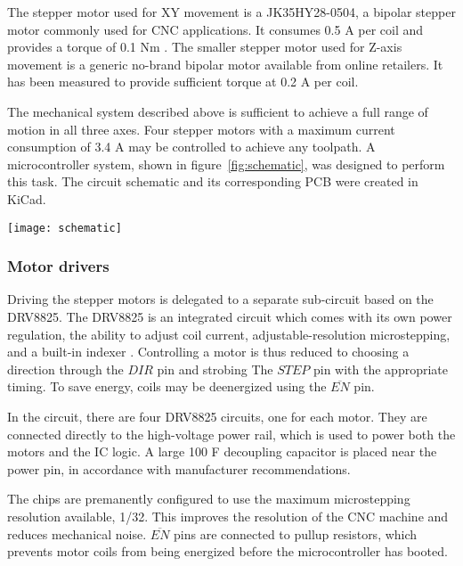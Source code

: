 The stepper motor used for XY movement is a JK35HY28-0504, a bipolar stepper
motor commonly used for CNC applications. It consumes 0.5 A per coil and
provides a torque of 0.1 Nm \cite{jk35hy28}. The smaller stepper motor used for
Z-axis movement is a generic no-brand bipolar motor available from online
retailers. It has been measured to provide sufficient torque at 0.2 A per coil.

The mechanical system described above is sufficient to achieve a full range of
motion in all three axes. Four stepper motors with a maximum current consumption
of 3.4 A may be controlled to achieve any toolpath. A microcontroller system,
shown in figure~\ref{fig:schematic}, was designed to perform this task. The
circuit schematic and its corresponding PCB were created in KiCad.

\clearpage
\begin{sidewaysfigure}[ht]
    \texttt{[image: schematic]}
    \caption{A schematic of the microcontroller system.}
    \label{fig:schematic}
\end{sidewaysfigure}

\clearpage

\subsubsection{Motor drivers}

Driving the stepper motors is delegated to a separate sub-circuit based on the
DRV8825. The DRV8825 is an integrated circuit which comes with its own power
regulation, the ability to adjust coil current, adjustable-resolution
microstepping, and a built-in indexer \cite{drv8825}. Controlling a motor is
thus reduced to choosing a direction through the $DIR$ pin and strobing The
$STEP$ pin with the appropriate timing. To save energy, coils may be deenergized
using the $\overline{EN}$ pin.

In the circuit, there are four DRV8825 circuits, one for each motor. They are
connected directly to the high-voltage power rail, which is used to power both
the motors and the IC logic. A large 100 {\textmu}F decoupling capacitor is
placed near the power pin, in accordance with manufacturer recommendations.

The chips are premanently configured to use the maximum microstepping resolution
available, 1/32. This improves the resolution of the CNC machine and
reduces mechanical noise. $\overline{EN}$ pins are connected to pullup
resistors, which prevents motor coils from being energized before the
microcontroller has booted.

